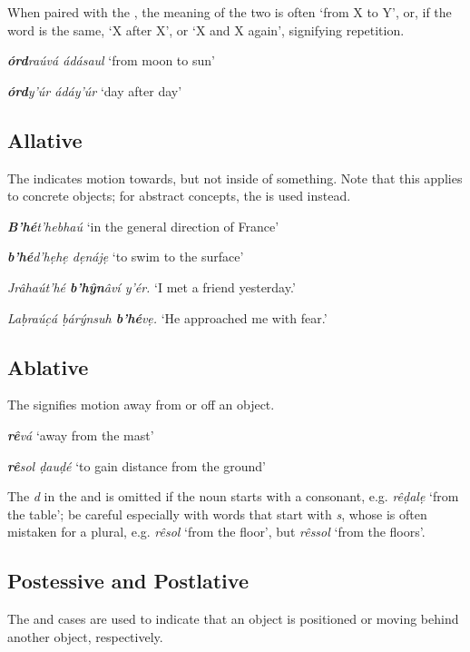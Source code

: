 \documentclass[a4paper, 12pt, twoside, openright, final]{book}
\def \b {ḅ}
\let \w \textit
\let \b \textbf
\begin{document}
When paired with the , the meaning of the two is often ‘from X to Y’, or, if the word is the same, ‘X after X’,
or ‘X and X again’, signifying repetition.
\begin{examples}
    \item \w{\b{órd}raúvá ádásaul} ‘from moon to sun’
    \item \w{\b{órd}y’úr ádáy’úr} ‘day after day’
\end{examples}

\subsection{Allative}
The  indicates motion towards, but not inside of something. Note that this applies to concrete objects; for
abstract concepts, the  is used instead.
\begin{examples}
    \item \w{\b{B’hé}t’hebhaú} ‘in the general direction of France’
    \item \w{\b{b’hé}d’hẹhẹ dẹnájẹ} ‘to swim to the surface’
    \item \w{Jrâhaút’hé \b{b’hŷn}âví y’ér.} ‘I met a friend yesterday.’
    \item \w{Laḅraúc̣á ḅárýnsuh \b{b’hé}vẹ.} ‘He approached me with fear.’
\end{examples}

\subsection{Ablative}
The  signifies motion away from or off an object.
\begin{examples}
    \item \w{\b{rê}vá} ‘away from the mast’
    \item \w{\b{rê}sol ḍauḍé} ‘to gain distance from the ground’
\end{examples}

The \w{d} in the  and is omitted if the noun starts with a consonant, e.g. \w{rêḍalẹ} ‘from the table’; be
careful especially with words that start with \w{s}, whose  is often mistaken for a plural, e.g. \w{rêsol}
‘from the floor’, but \w{rêssol} ‘from the floors’.

\subsection{Postessive and Postlative}
The  and  cases are used to indicate that an object is positioned or moving behind another object,
respectively.
\end{document}
